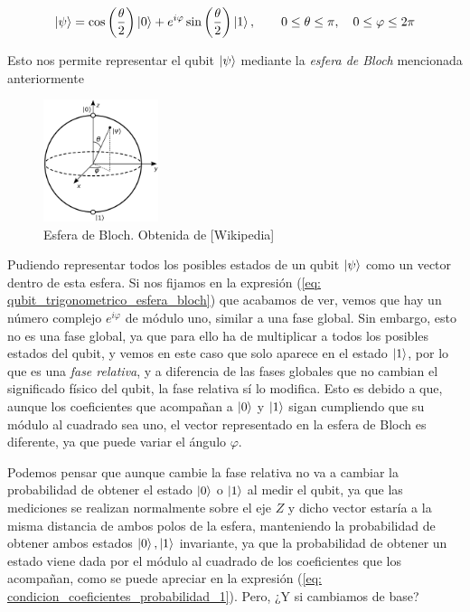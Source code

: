 \documentclass{article}
\numberwithin{equation}{section} %
\begin{document}
    \begin{equation}
        \ket{\psi} = \cos \left( \frac{\theta}{2} \right) \ket{0} + e^{i \varphi} \sin \left( \frac{\theta}{2} \right) \ket{1}, \qquad 0 \leq \theta \leq \pi, \quad 0 \leq \varphi \leq 2 \pi
        \label{eq: qubit_trigonometrico_esfera_bloch}
    \end{equation}

    \vspace{2.5mm}

    Esto nos permite representar el qubit \( \ket{\psi} \) mediante la \textit{esfera de Bloch} mencionada anteriormente

    \begin{figure}[H]
        \centering
        \includegraphics[width=0.3\textwidth]{img/bloch_sphere.png}
        \caption{Esfera de Bloch. Obtenida de [Wikipedia]}\label{fig: bloch_sphere}
    \end{figure}

    Pudiendo representar todos los posibles estados de un qubit \( \ket{\psi} \) como un vector dentro de esta esfera. 
    Si nos fijamos en la expresión (\ref{eq: qubit_trigonometrico_esfera_bloch}) que acabamos de ver, vemos que hay un número complejo \( e^{i \varphi} \) de módulo uno, similar a una fase global. Sin embargo, esto no es una fase global, ya que para ello ha de multiplicar a todos los posibles estados del qubit, y vemos en este caso que solo aparece en el estado \( \ket{1} \), por lo que es una \textit{fase relativa}, y a diferencia de las fases globales que no cambian el significado físico del qubit, la fase relativa sí lo modifica. Esto es debido a que, aunque los coeficientes que acompañan a \( \ket{0} \) y \( \ket{1} \) sigan cumpliendo que su módulo al cuadrado sea uno, el vector representado en la esfera de Bloch es diferente, ya que puede variar el ángulo \( \varphi \).

    \vspace{5mm}

    Podemos pensar que aunque cambie la fase relativa no va a cambiar la probabilidad de obtener el estado \( \ket{0} \) o \( \ket{1} \) al medir el qubit, ya que las mediciones se realizan normalmente sobre el eje \( Z \) y dicho vector estaría a la misma distancia de ambos polos de la esfera, manteniendo la probabilidad de obtener ambos estados \( \ket{0}, \ket{1} \) invariante, ya que la probabilidad de obtener un estado viene dada por el módulo al cuadrado de los coeficientes que los acompañan, como se puede apreciar en la expresión (\ref{eq: condicion_coeficientes_probabilidad_1}). Pero, ¿Y si cambiamos de base?
    
\end{document}
